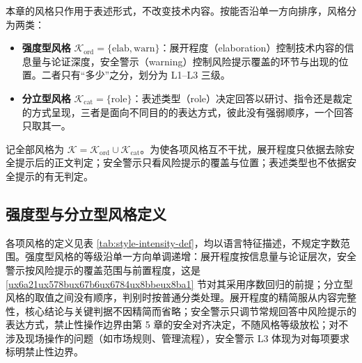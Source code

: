 \documentclass[fontset=fandol,type=master,campus=shenzhen,etitleauto=true]{hithesisbook}
\providecommand{\tightlist}{%
  \setlength{\itemsep}{0pt}\setlength{\parskip}{0pt}}
\begin{document}
本章的风格只作用于表述形式，不改变技术内容。按能否沿单一方向排序，风格分为两类：
\begin{itemize}
\tightlist
\item \textbf{强度型风格} $\mathcal{K}_{\text{ord}} = \{\text{elab}, \text{warn}\}$：展开程度（elaboration）控制技术内容的信息量与论证深度，安全警示（warning）控制风险提示覆盖的环节与出现的位置。二者只有“多少”之分，划分为 L1--L3 三级。
\item \textbf{分立型风格} $\mathcal{K}_{\text{cat}} = \{\text{role}\}$：表述类型（role）决定回答以研讨、指令还是裁定的方式呈现，三者是面向不同目的的表达方式，彼此没有强弱顺序，一个回答只取其一。
\end{itemize}
记全部风格为 $\mathcal{K} = \mathcal{K}_{\text{ord}} \cup \mathcal{K}_{\text{cat}}$。为使各项风格互不干扰，展开程度只依据去除安全提示后的正文判定；安全警示只看风险提示的覆盖与位置；表述类型也不依据安全提示的有无判定。

\subsection{强度型与分立型风格定义}\label{ux98ceux683cux5f3aux5ea6ux7b49ux7ea7ux5212ux5206}

各项风格的定义见表 \ref{tab:style-intensity-def}，均以语言特征描述，不规定字数范围。强度型风格的等级沿单一方向单调递增：展开程度按信息量与论证层次，安全警示按风险提示的覆盖范围与前置程度，这是 \ref{ux6a21ux578bux67b6ux6784ux8bbeux8ba1} 节对其采用序数回归的前提；分立型风格的取值之间没有顺序，判别时按普通分类处理。展开程度的精简服从内容完整性，核心结论与关键判据不因精简而省略；安全警示只调节常规回答中风险提示的表达方式，禁止性操作边界由第 5 章的安全对齐决定，不随风格等级放松；对不涉及现场操作的问题（如市场规则、管理流程），安全警示 L3 体现为对每项要求标明禁止性边界。
\end{document}
